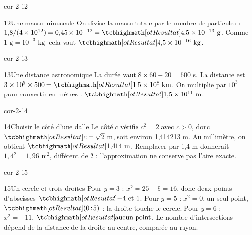 \begin{blocLivre}{cor-2-12}\begin{corrige}{12}{Une masse minuscule}
On divise la masse totale par le nombre de particules : $1{,}8/(4\times10^{12})=0{,}45\times10^{-12}=\res{4{,}5\times10^{-13}\text{ g}}$. Comme $1\text{ g}=10^{-3}\text{ kg}$, cela vaut $\res{4{,}5\times10^{-16}\text{ kg}}$.
\end{corrige}\end{blocLivre}
\begin{blocLivre}{cor-2-13}\begin{corrige}{13}{Une distance astronomique}
La durée vaut $8\times60+20=500$ s. La distance est $3\times10^5\times500=\res{1{,}5\times10^8\text{ km}}$. On multiplie par $10^3$ pour convertir en mètres : $\res{1{,}5\times10^{11}\text{ m}}$.
\end{corrige}\end{blocLivre}
\begin{blocLivre}{cor-2-14}\begin{corrige}{14}{Choisir le côté d’une dalle}
Le côté $c$ vérifie $c^2=2$ avec $c>0$, donc $\res{c=\sqrt2\text{ m}}$, soit environ 1,414213 m. Au millimètre, on obtient $\res{1{,}414\text{ m}}$. Remplacer par 1,4 m donnerait $1{,}4^2=1{,}96$ m$^2$, différent de 2 : l’approximation ne conserve pas l’aire exacte.
\end{corrige}\end{blocLivre}
\begin{blocLivre}{cor-2-15}\begin{corrige}{15}{Un cercle et trois droites}
Pour $y=3$ : $x^2=25-9=16$, donc deux points d’abscisses $\res{-4\text{ et }4}$. Pour $y=5$ : $x^2=0$, un seul point, $\res{(0\,;5)}$ : la droite touche le cercle. Pour $y=6$ : $x^2=-11$, $\res{\text{aucun point}}$. Le nombre d’intersections dépend de la distance de la droite au centre, comparée au rayon.
\label{fig-cor-2-15}
\end{corrige}\end{blocLivre}
